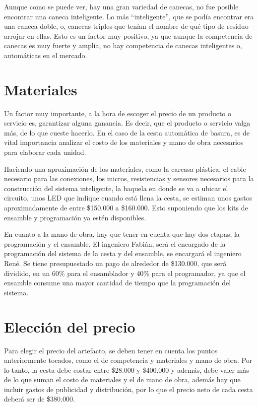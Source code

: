 \documentclass[letterpaper,12pt]{scrreprt}
\begin{document}
    Aunque como se puede ver, hay una gran variedad de canecas, no fue posible encontrar una caneca inteligente. Lo más “inteligente”, que se podía encontrar era una caneca doble, o, canecas triples que tenían el nombre de qué tipo de residuo arrojar en ellas. Esto es un factor muy positivo, ya que aunque la competencia de canecas es muy fuerte y amplia, no hay competencia de canecas inteligentes o, automáticas en el mercado.

    \section{Materiales}
    Un factor muy importante, a la hora de escoger el precio de un producto o servicio es, garantizar alguna ganancia. Es decir, que el producto o servicio valga más, de lo que cueste hacerlo. En el caso de la cesta automática de basura, es de vital importancia analizar el costo de los materiales y mano de obra necesarios para elaborar cada unidad.

    Haciendo una aproximación de los materiales, como la carcasa plástica, el cable necesario para las conexiones, los micros, resistencias y sensores necesarios para la construcción del sistema inteligente, la baquela en donde se va a ubicar el circuito, unos LED que indique cuando está llena la cesta, se estiman unos gastos aproximadamente de entre \$150.000 a \$160.000. Esto suponiendo que los kits de ensamble y programación ya estén disponibles.

    En cuanto a la mano de obra, hay que tener en cuenta que hay dos etapas, la programación y el ensamble. El ingeniero Fabián, será el encargado de la programación del sistema de la cesta y del ensamble, se encargará el ingeniero René. Se tiene presupuestado un pago de alrededor de \$130.000, que será dividido, en un 60\% para el ensamblador y 40\% para el programador, ya que el ensamble consume una mayor cantidad de tiempo que la programación del sistema.

    \section{Elección del precio}
    Para elegir el precio del artefacto, se deben tener en cuenta los puntos anteriormente tocados, como el de competencia y materiales y mano de obra. Por lo tanto, la cesta debe costar entre \$28.000 y \$400.000 y además, debe valer más de lo que suman el costo de materiales y el de mano de obra, además hay que incluir gastos de publicidad y distribución, por lo que el precio neto de cada cesta deberá ser de \$380.000.
\end{document}
